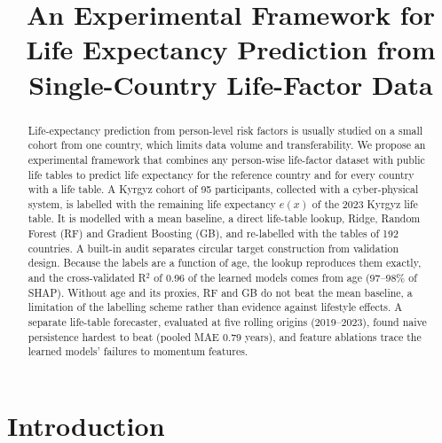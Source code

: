 \documentclass[runningheads]{llncs}
\begin{document}
\title{An Experimental Framework for Life Expectancy Prediction from Single-Country Life-Factor Data}


\maketitle

\begin{abstract}
Life-expectancy prediction from person-level risk factors is usually studied on a small cohort
from one country, which limits data volume and transferability. We propose an experimental
framework that combines any person-wise life-factor dataset with public life tables to predict
life expectancy for the reference country and for every country with a life table. A Kyrgyz
cohort of 95 participants, collected with a cyber-physical system, is labelled with the remaining
life expectancy $e(x)$ of the 2023 Kyrgyz life table. It is modelled with a mean baseline, a direct
life-table lookup, Ridge, Random Forest (RF) and Gradient Boosting (GB), and re-labelled with the
tables of 192 countries. A built-in audit separates circular target construction from validation
design. Because the labels are a function of age, the lookup reproduces them exactly, and the
cross-validated R$^2$ of 0.96 of the learned models comes from age (97--98\% of SHAP). Without age
and its proxies, RF and GB do not beat the mean baseline, a limitation of the labelling scheme
rather than evidence against lifestyle effects. A separate life-table forecaster, evaluated at five
rolling origins (2019--2023), found naive persistence hardest to beat (pooled MAE 0.79 years), and
feature ablations trace the learned models' failures to momentum features.
\end{abstract}

\section{Introduction}
\end{document}
